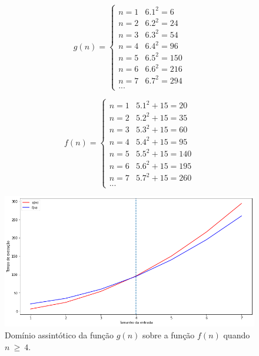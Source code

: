\documentclass[11pt,fleqn]{book} %
\begin{document}
\begin{minipage}[c]{.5\textwidth}
\[ g(n) =
  \begin{cases}
    n=1  & 6.1^2 = 6\\
    n=2  & 6.2^2 = 24\\
    n=3  & 6.3^2 = 54\\
    n=4  & 6.4^2 = 96\\
    n=5  & 6.5^2 = 150\\
    n=6  & 6.6^2 = 216\\
    n=7  & 6.7^2 = 294\\
    ...
  \end{cases}
\]
\end{minipage}\hfill
\begin{minipage}[c]{.5\textwidth}
\[ f(n) =
  \begin{cases}
    n=1  & 5.1^2+15 = 20\\
    n=2  & 5.2^2+15 = 35\\
    n=3  & 5.3^2+15 = 60\\
    n=4  & 5.4^2+15 = 95\\
    n=5  & 5.5^2+15 = 140\\
    n=6  & 5.6^2+15 = 195\\
    n=7  & 5.7^2+15 = 260\\
    ...
  \end{cases}
\]
\end{minipage}
\hfill
\begin{figure}[htbp]
\centering
	\includegraphics[width=.95\textwidth]{Pictures/BigO.png}
	\caption[Big O]{Domínio assintótico da função $g(n)$ sobre a função $f(n)$ quando $n~\geq~4$.}
	\label{BigO}
\end{figure}
\end{document}

